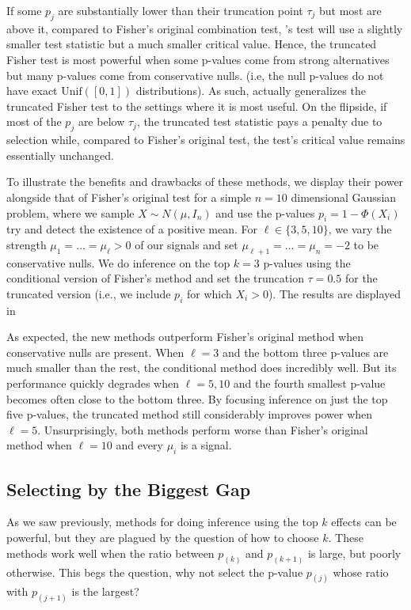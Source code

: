 \documentclass{article}
\begin{document}
If some $p_j$ are substantially lower than their truncation point $\tau_j$ but most are above it, compared to Fisher's original combination test, 's test will use a slightly smaller test statistic but a much smaller critical value. Hence, the truncated Fisher test is most powerful when some p-values come from strong alternatives but many p-values come from conservative nulls. (i.e, the null p-values do not have exact $\text{Unif}([0, 1])$ distributions). As such,  actually generalizes the truncated Fisher test to the settings where it is most useful. On the flipside, if most of the $p_j$ are below $\tau_j$, the truncated test statistic pays a penalty due to selection while, compared to Fisher's original test, the test's critical value remains essentially unchanged. 

To illustrate the benefits and drawbacks of these methods, we display their power alongside that of Fisher's original test for a simple $n=10$ dimensional Gaussian problem, where we sample $X \sim N(\mu, I_n)$ and use the p-values $p_i = 1 - \Phi(X_i)$ try and detect the existence of a positive mean. For $\ell \in \{3, 5, 10\}$, we vary the strength $\mu_1 = \dots = \mu_{\ell} > 0$ of our signals and set $\mu_{\ell + 1} = \dots = \mu_n = -2$ to be conservative nulls. We do inference on the top $k=3$ p-values using the conditional version of Fisher's method and set the truncation $\tau = 0.5$ for the truncated version (i.e., we include $p_i$ for which $X_i > 0$). The results are displayed in 

As expected, the new methods outperform Fisher's original method when conservative nulls are present. When $\ell=3$ and the bottom three p-values are much smaller than the rest, the conditional method does incredibly well. But its performance quickly degrades when $\ell = 5, 10$ and the fourth smallest p-value becomes often close to the bottom three. By focusing inference on just the top five p-values, the truncated method still considerably improves power when $\ell=5$. Unsurprisingly, both methods perform worse than Fisher's original method when $\ell=10$ and every $\mu_i$ is a signal. 


\subsection{Selecting by the Biggest Gap}

As we saw previously, methods for doing inference using the top $k$ effects can be powerful, but they are plagued by the question of how to choose $k$. These methods work well when the ratio between $p_{(k)}$ and $p_{(k+1)}$ is large, but poorly otherwise. This begs the question, why not select the p-value $p_{(j)}$ whose ratio with $p_{(j+1)}$ is the largest?
\end{document}

